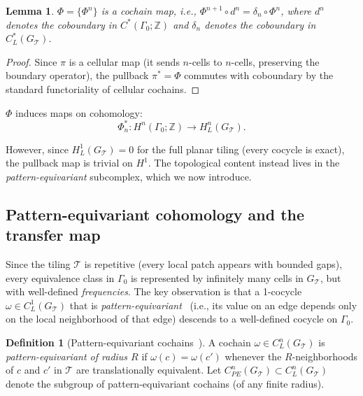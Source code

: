 \documentclass[12pt]{article}
\newtheorem{lemma}[theorem]{Lemma}
\theoremstyle{definition}
\newtheorem{definition}[theorem]{Definition}
\theoremstyle{remark}
\newcommand{\ZZ}{\mathbb{Z}}
\begin{document}
\begin{lemma}
\label{lem:cochain-map}
$\Phi = \{\Phi^n\}$ is a cochain map, i.e., $\Phi^{n+1} \circ d^n = \delta_n \circ \Phi^n$, where $d^n$ denotes the coboundary in $C^*(\Gamma_0; \ZZ)$ and $\delta_n$ denotes the coboundary in $C^*_L(G_{\mathcal{T}})$.
\end{lemma}

\begin{proof}
Since $\pi$ is a cellular map (it sends $n$-cells to $n$-cells, preserving the boundary operator), the pullback $\pi^* = \Phi$ commutes with coboundary by the standard functoriality of cellular cochains.
\end{proof}

$\Phi$ induces maps on cohomology:
\begin{equation}
\Phi^*_n: H^n(\Gamma_0; \ZZ) \to H^n_L(G_{\mathcal{T}}).
\label{eq:induced-map}
\end{equation}

However, since $H^1_L(G_{\mathcal{T}}) = 0$ for the full planar tiling (every cocycle is exact), the pullback map is trivial on $H^1$. The topological content instead lives in the \emph{pattern-equivariant} subcomplex, which we now introduce.

\subsection{Pattern-equivariant cohomology and the transfer map}

Since the tiling $\mathcal{T}$ is repetitive (every local patch appears with bounded gaps), every equivalence class in $\Gamma_0$ is represented by infinitely many cells in $G_{\mathcal{T}}$, but with well-defined \emph{frequencies}. The key observation is that a 1-cocycle $\omega \in C^1_L(G_{\mathcal{T}})$ that is \emph{pattern-equivariant}~\cite{KellendonkPutnam2006} (i.e., its value on an edge depends only on the local neighborhood of that edge) descends to a well-defined cocycle on $\Gamma_0$.

\begin{definition}[Pattern-equivariant cochains~\cite{KellendonkPutnam2006}]
\label{def:pattern-equiv}
A cochain $\omega \in C^n_L(G_{\mathcal{T}})$ is \emph{pattern-equivariant of radius $R$} if $\omega(c) = \omega(c')$ whenever the $R$-neighborhoods of $c$ and $c'$ in $\mathcal{T}$ are translationally equivalent. Let $C^n_{PE}(G_{\mathcal{T}}) \subset C^n_L(G_{\mathcal{T}})$ denote the subgroup of pattern-equivariant cochains (of any finite radius).
\end{definition}
\end{document}
